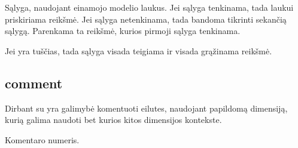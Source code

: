 \documentclass[letterpaper,10pt,lithuanian]{sphinxmanual}
\begin{document}
\begin{fulllineitems}
\label{\detokenize{dimensijos:switch.switch.prepare}}
\pysigstartsignatures
{}
\pysigstopsignatures
\sphinxAtStartPar
Sąlyga, naudojant einamojo modelio laukus. Jei sąlyga tenkinama, tada
laukui priskiriama {\hyperref[\detokenize{dimensijos:switch.switch.source}]{}} reikšmė. Jei sąlyga
netenkinama, tada bandoma tikrinti sekančią sąlygą. Parenkama ta
reikšmė, kurios pirmoji sąlyga tenkinama.

\sphinxAtStartPar
Jei {\hyperref[\detokenize{dimensijos:switch.switch.prepare}]{}} yra tuščias, tada sąlyga visada teigiama ir
visada grąžinama {\hyperref[\detokenize{dimensijos:switch.switch.source}]{}} reikšmė.

\end{fulllineitems}



\subsection{comment}
\label{\detokenize{dimensijos:comment}}\label{\detokenize{dimensijos:id14}}\label{\detokenize{dimensijos:module-comment}}
\sphinxAtStartPar
Dirbant su {\hyperref[\detokenize{savokos:term-DSA}]{}} yra galimybė komentuoti eilutes, naudojant papildomą
{\hyperref[\detokenize{dimensijos:module-comment}]{}} dimensiją, kurią galima naudoti bet kurios kitos dimensijos
kontekste.

\begin{fulllineitems}
\label{\detokenize{dimensijos:comment.id}}
\pysigstartsignatures
{}
\pysigstopsignatures
\sphinxAtStartPar
Komentaro numeris.

\end{fulllineitems}

\end{document}
